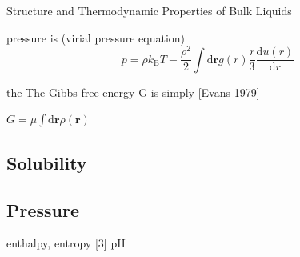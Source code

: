 Structure and Thermodynamic Properties of Bulk Liquids

pressure is (virial pressure equation) 
\begin{equation}
p=\rho k_{\mathrm{B}}T-\dfrac{\rho^{2}}{2}\int\mathrm{d}\mathbf{r}g(r)\frac{r}{3}\frac{\mathrm{d}u(r)}{\mathrm{d}r}
\end{equation}

the The Gibbs free energy G is simply {[}Evans 1979{]}

$G=\mu\int\mathrm{d}\mathbf{r}\rho(\mathbf{r})$

\subsection{Solubility}

\subsection{Pressure}

enthalpy, entropy {[}3{]} pH
